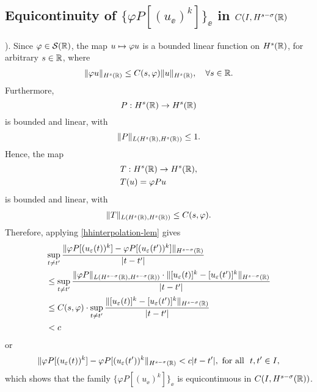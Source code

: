 \subsection{Equicontinuity of $\{ \varphi P [(u_\ee)^k]\}_\ee$  in $C(I,
H^{s-\sigma}(\mathbb{R})$}).
%
%
Since $\varphi \in \mathcal{S}(\mathbb{R})$, the map $u \mapsto \varphi u$
is a bounded linear function on $H^s(\mathbb{R})$, for arbitrary $s \in
\mathbb{R}$, where  
\begin{equation}
\begin{split}
\|\varphi u\|_{H^s(\mathbb{R})} \le C(s, \varphi)
\|u\|_{H^s(\mathbb{R})}, \quad \forall s\in \mathbb{R}.
\label{hhschwartz-estimate}
\end{split}
\end{equation}
Furthermore, $$P: H^s(\mathbb{R}) \to H^s(\mathbb{R})$$ is bounded and linear,
with 
\begin{equation}
\label{operator-normaa}
\|P\|_{L(H^s(\mathbb{R}), H^s(\mathbb{R}))} \le 1.
\end{equation}
Hence, the map 
\begin{equation}
\label{the-map}
\begin{split}
& T: H^s(\mathbb{R}) \to H^s(\mathbb{R}),
\\
& T(u) = \varphi P u 
\end{split}
\end{equation}
is bounded and linear, with 
\begin{equation}
\begin{split}
\|T\|_{L(H^s(\mathbb{R}), H^s(\mathbb{R}))} \le C(s, \varphi).
\label{op-norm-product}
\end{split}
\end{equation}
Therefore, applying \cref{hhinterpolation-lem} gives 
%
\begin{equation*}
\begin{split}
\label{hhequic-1}
& \sup_{t \neq t'} \frac {\| \varphi P [(u_\varepsilon(t))^k] - \varphi
P [(u_\varepsilon(t'))^k] \|_{H^{s -
\sigma  }(\mathbb{R})}}{|t - t'|}
\\
& \le \sup_{t \neq t'}  \frac {\|\varphi P \|_{L(H^{s-\sigma}(\mathbb{R}),
H^{s-\sigma}(\mathbb{R}))} \cdot \|   [u_\varepsilon(t)]^k  - 
[u_\varepsilon(t')]^k \|_{H^{s -
\sigma }(\mathbb{R})}}{|t - t'|}
\\
& \le C(s, \varphi) \cdot \sup_{t \neq t'}  \frac {\|   [u_\varepsilon(t)]^k  - 
[u_\varepsilon(t')]^k \|_{H^{s -
\sigma }(\mathbb{R})}}{|t - t'|}
\\
&< c
\end{split}
\end{equation*}
%
or
%
\begin{equation*}
\label{hhequic-2}
\|\varphi P [(u_\varepsilon(t))^k] - \varphi
P [(u_\varepsilon(t'))^k \|_{H^{s - \sigma }(\mathbb{R})}< c|t -
t'|, 
\ \text{for all} \   \,\,  t, t'\in I,
\end{equation*}
%
which shows that  the family  $\{\varphi P [(u_\ee)^k]\}_\ee$ is
equicontinuous in $C(I, H^{s-\sigma }(\mathbb{R}))$.  
%
%
%
%
%
%
%
%
%
%
%		
